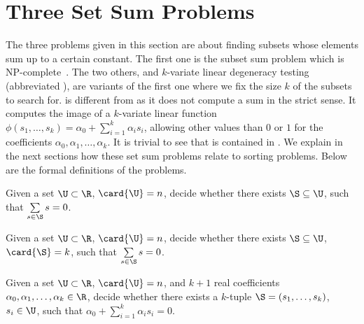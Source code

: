 
\section{Three Set Sum Problems}

The three problems given in this section are about finding subsets whose
elements sum up to a certain constant. The first one is the subset sum problem
which is NP-complete~\cite{karp:1972}. The two others, \kSUM and \(k\)-variate
linear degeneracy testing (abbreviated \kLDT), are
variants of the first one where we fix the size $k$ of the subsets to search
for. \kLDT is different from \kSUM as it does not compute a sum in the
strict sense. It computes the image of a $k$-variate linear function
$\phi(s_1, \ldots, s_k) = \alpha_0 + \sum_{i=1}^{k} \alpha_i s_i$, allowing
other values than $0$ or $1$ for the coefficients $\alpha_0, \alpha_1, \ldots,
\alpha_k$. It is trivial to see that \kSUM is contained in \kLDT. We
explain in the next sections how these set sum problems relate to sorting
problems. Below are the formal definitions of the problems.

\begin{problem}
Given a set $\U \subset \R$, $\card{\U} = n$, decide whether there exists
$\S \subseteq \U$, such that $\sum\limits_{s \in \S} s = 0$.
\end{problem}

\begin{problem}[\kSUM]
Given a set $\U \subset \R$, $\card{\U} = n$, decide whether there exists
$\S \subseteq \U$, $\card{\S} = k$, such that $\sum\limits_{s
\in \S} s = 0$.
\end{problem}

\begin{problem}[\kLDT]
Given a set $\U \subset \R$, $\card{\U} = n$, and $k+1$ real
coefficients $\alpha_0, \alpha_1, \ldots, \alpha_k \in \R$, decide whether
there exists a $k$-tuple
$\S = (s_1, \ldots, s_k)$, $s_i \in \U$, such that
$\alpha_0 + \sum_{i=1}^{k} \alpha_i s_i = 0$.
\end{problem}
